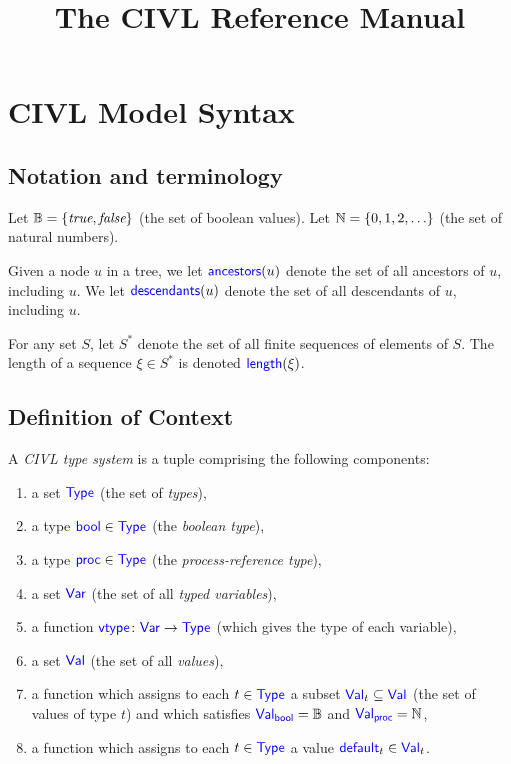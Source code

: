 \documentclass[11pt]{article}
\title{The CIVL Reference Manual}
\begin{document}
\maketitle

\section{CIVL Model Syntax}

\subsection{Notation and terminology}
\label{sec:notation}

Let $\B=\{\true,\false\}$ (the set of boolean values).  Let
$\N=\{0,1,2,\ldots\}$ (the set of natural numbers).

Given a node $u$ in a tree, we let $\ancestors(u)$ denote the set of
all ancestors of $u$, including $u$.  We let $\descendants(u)$ denote
the set of all descendants of $u$, including $u$.

For any set $S$, let $S^*$ denote the set of all finite sequences of
elements of $S$.  The length of a sequence $\xi\in S^*$ is denoted
$\len(\xi)$.  


\subsection{Definition of Context}
\label{sec:context}

\begin{definition}
  A \emph{CIVL type system} is a tuple comprising the following
  components:
  \begin{enumerate}
  \item a set $\Type$ (the set of \emph{types}),
  \item a type $\bool\in\Type$ (the \emph{boolean type}),
  \item a type $\proc\in\Type$ (the \emph{process-reference type}),
  \item a set $\Var$ (the set of all \emph{typed variables}),
  \item a function $\vtype\colon \Var\ra\Type$ (which gives the
    type of each variable),
  \item a set $\Val$ (the set of all \emph{values}),
  \item a function which assigns to each $t\in\Type$ a subset
    $\Val_t\subseteq\Val$ (the set of values of type $t$)
    and which satisfies $\Val_{\bool}=\B$ and $\Val_{\proc}=\N$,
  \item a function which assigns to each $t\in\Type$ a value
    $\default_t\in\Val_t$.
  \end{enumerate}
\end{definition}
\end{document}
